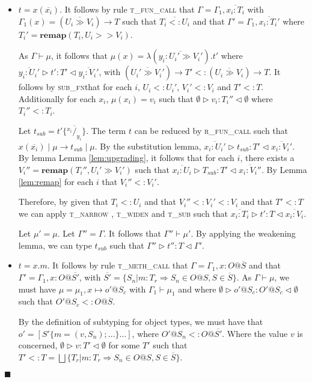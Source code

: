 \documentclass[preprint]{sigplanconf}
\newcommand{\lemref}[1]{Lemma \ref{#1}}
\newcommand{\rfunc}{\textsc{r\_fun\_call} }
\newcommand{\tfunc}{\textsc{t\_fun\_call} }
\newcommand{\tmethc}{\textsc{t\_meth\_call} }
\newcommand{\tsub}{\textsc{t\_sub} }
\newcommand{\tnarrow}{\textsc{t\_narrow} }
\newcommand{\twiden}{\textsc{t\_widen} }
\newcommand{\subfn}{\textsc{sub\_fn}}
\newcommand{\remapapp}[3]{\ensuremath{\mathbf{remap}(#1, #2 \gg #3)}}
\newcommand{\typerule}[4]{#1 \triangleright #2 : #3 \triangleleft #4}
\newcommand{\subst}[3]{#3 \{\overline{^{#1}/_{#2}}\}}
\newcommand{\funv}[4]{\lambda(\overline{#1 : #2 \gg #3}).#4}
\newcommand{\funt}[3]{(\overline{#1 \gg #2}) \rightarrow #3}
\newcommand{\qed}{$\blacksquare$}
\newenvironment{proof}{\vspace{1ex}\noindent{\bf Proof}\hspace{0.5em}}
  {\hfill\qed\vspace{1ex}}
\begin{document}
\begin{proof}
\begin{itemize}
\begin{itemize}
  \end{itemize}

\item $t = x ( \overline{x_i} )$. It follows by rule \tfunc that
$\Gamma = \Gamma_1, \overline{x_i : T_i}$ 
with $\Gamma_1(x) = \funt{U_i}{V_i}{T}$
such that $\overline{T_i <: U_i}$ 
and that $\Gamma' = \Gamma_1, \overline{x_i : T_i'}$
where $T_i' = \mathbf{remap} ( T_i, U_i >> V_i )$.

As $\Gamma \vdash \mu$, 
it follows that $\mu(x) = \funv{y_i}{U_i'}{V_i'}{t'}$
where $\typerule{\overline{y_i : U_i'}}{t'}{T'}{\overline{y_i : V_i'}}$,
with $\funt{U_i'}{V_i'}{T'} <: \funt{U_i}{V_i}{T}$. It
follows by \subfn that for each $i$, $U_i <: U_i'$, $V_i' <: V_i$
and $T' <: T$.
Additionally for each $x_i$, $\mu(x_i) = v_i$ such that 
$\typerule{\emptyset}{v_i}{T_i''}{\emptyset}$ 
where $T_i'' <: T_i$.

Let $t_{sub} = \subst{x_i}{y_i}{t'}$.
The term $t$ can be reduced by \rfunc such that
$x ( \overline{x_i} ) \mid \mu \longrightarrow t_{sub} \mid \mu$.
By the substitution lemma, 
$\typerule{\overline{x_i : U_i'}}{t_{sub}}{T'}{\overline{x_i : V_i'}}$.
By lemma \lemref{lem:upgrading}, it follows that
for each $i$, there exists a $V_i'' = \remapapp{T_i''}{U_i'}{V_i'}$
such that 
$\typerule{\overline{x_i : U_i}}{T_{sub}}{T'}{\overline{x_i : V_i''}}$.
By \lemref{lem:remap} for each $i$ that $V_i'' <: V_i'$.

Therefore, by given that $T_i <: U_i$ and that $V_i'' <: V_i' <: V_i$
and that $T' <: T$ we can apply \tnarrow, \twiden and \tsub
such that $\typerule{\overline{x_i : T_i}}{t'}{T}{\overline{x_i : V_i}}$.

Let $\mu' = \mu$. Let $\Gamma'' = \Gamma$. It follows that 
$\Gamma'' \vdash \mu'$. By applying the weakening lemma, we can type 
$t_{sub}$ such that $\typerule{\Gamma''}{t''}{T}{\Gamma'}$.

\item $t = x.m$. It follows by rule \tmethc that
$\Gamma = \Gamma_1, x : O@\overline{S}$ and that 
$\Gamma' = \Gamma_1, x : O@\overline{S'}$, with
$\overline{S'} = \{ S_n | m : T_r \Rightarrow S_n \in O@S, S \in \overline{S} \}$.
As
$\Gamma \vdash \mu$, we must have $\mu = \mu_1, x \mapsto o'@S_c$ with
$\Gamma_1 \vdash \mu_1$ and where
$\typerule{\emptyset}{o'@S_c}{O'@S_c}{\emptyset}$ such that
$O'@S_c <: O@\overline{S}$. 

By the definition of subtyping for object types,
we must have that
$o' = [ S' \{ m = (v,S_n) ; ... \} ... ]$, where $O'@S_n <: O@\overline{S'}$. 
Where the value $v$ is concerned, $\typerule{\emptyset}{v}{T'}{\emptyset}$
for some $T'$ such that $T' <: T = \bigsqcup{ \{ T_r | m : T_r \Rightarrow S_n \in O@S, S \in \overline{S} \} }$.


\end{itemize}
\end{proof}
\end{document}
